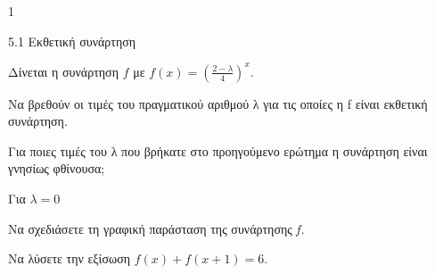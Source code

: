 \begin{ylh}{1}
\item 5.1 Εκθετική συνάρτηση
\end{ylh}
Δίνεται η συνάρτηση $f$ με $f(x) = {(\frac{2 - \lambda}{4})}^{x}$.
\begin{alist}
\item Να βρεθούν οι τιμές του πραγματικού αριθμού λ για τις οποίες η f είναι εκθετική συνάρτηση.
\item Για ποιες τιμές του λ που βρήκατε στο προηγούμενο ερώτημα η συνάρτηση είναι γνησίως
φθίνουσα;
\item Για $\lambda = 0$
\begin{rlist}
\item Nα σχεδιάσετε τη γραφική παράσταση της συνάρτησης$\ f.$
\item Να λύσετε την εξίσωση $f(x) + f(x + 1) = 6.$
\end{rlist}
\end{alist}

